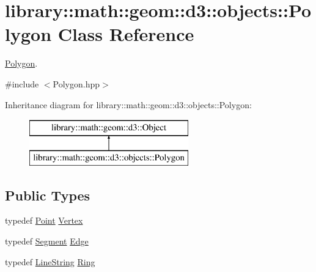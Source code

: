 \hypertarget{classlibrary_1_1math_1_1geom_1_1d3_1_1objects_1_1_polygon}{}\section{library\+:\+:math\+:\+:geom\+:\+:d3\+:\+:objects\+:\+:Polygon Class Reference}
\label{classlibrary_1_1math_1_1geom_1_1d3_1_1objects_1_1_polygon}


\hyperlink{classlibrary_1_1math_1_1geom_1_1d3_1_1objects_1_1_polygon}{Polygon}.  




{\ttfamily \#include $<$Polygon.\+hpp$>$}

Inheritance diagram for library\+:\+:math\+:\+:geom\+:\+:d3\+:\+:objects\+:\+:Polygon\+:\begin{figure}[H]
\begin{center}
\leavevmode
\includegraphics[height=2.000000cm]{classlibrary_1_1math_1_1geom_1_1d3_1_1objects_1_1_polygon}
\end{center}
\end{figure}
\subsection*{Public Types}
\begin{DoxyCompactItemize}
\item 
typedef \hyperlink{classlibrary_1_1math_1_1geom_1_1d3_1_1objects_1_1_point}{Point} \hyperlink{classlibrary_1_1math_1_1geom_1_1d3_1_1objects_1_1_polygon_a12c41d13f2128442c1a15b9eaa08e1d0}{Vertex}
\item 
typedef \hyperlink{classlibrary_1_1math_1_1geom_1_1d3_1_1objects_1_1_segment}{Segment} \hyperlink{classlibrary_1_1math_1_1geom_1_1d3_1_1objects_1_1_polygon_a7962e0559e972fe43eef942ce318fb8d}{Edge}
\item 
typedef \hyperlink{classlibrary_1_1math_1_1geom_1_1d3_1_1objects_1_1_line_string}{Line\+String} \hyperlink{classlibrary_1_1math_1_1geom_1_1d3_1_1objects_1_1_polygon_a3fd1a36a8215242aebb73a2275dc5e45}{Ring}
\end{DoxyCompactItemize}
